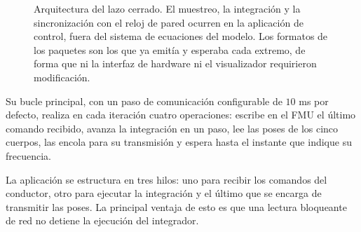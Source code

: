 \begin{figure}[H]
\centering
{}
\caption[Arquitectura de cosimulación]{Arquitectura del lazo cerrado. El muestreo, la integración y la sincronización con el reloj de pared ocurren en la aplicación de control, fuera del sistema de ecuaciones del modelo. Los formatos de los paquetes son los que ya emitía y esperaba cada extremo, de forma que ni la interfaz de hardware ni el visualizador requirieron modificación.}
\label{fig:cosim}
\end{figure}

Su bucle principal, con un paso de comunicación configurable de $10$ ms por defecto, realiza en cada iteración cuatro operaciones: escribe en el FMU el último comando recibido, avanza la integración en un paso, lee las poses de los cinco cuerpos, las encola para su transmisión y espera hasta el instante que indique su frecuencia. 


La aplicación se estructura en tres hilos: uno para recibir los comandos del conductor, otro para ejecutar la integración y el último que se encarga de transmitir las poses. La principal ventaja de esto es que una lectura bloqueante de red no detiene la ejecución del integrador.



